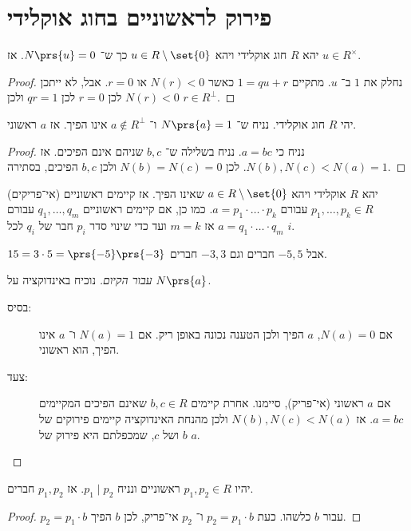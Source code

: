 \documentclass[a4paper,10pt,twoside,openany]{book}
\begin{document}
\section{פירוק לראשוניים בחוג אוקלידי}
\begin{proposition}
יהא
$R$
חוג אוקלידי ויהא
$u \in R \setminus \set{0}$
כך ש־%
$N\prs{u} = 0$.
אז
$u \in R^{\times}$.
\end{proposition}
\begin{proof}
נחלק את
$1$
ב־%
$u$.
מתקיים
$1 = qu + r$
כאשר
$N(r) < 0$
או
$r = 0$.
אבל, לא ייתכן
$N(r) < 0$
לכן
$r=0$
לכן
$qr = 1$
ולכן
$r \in R^{\perp}$.
\end{proof}
\begin{proposition}
יהי
$R$
חוג אוקלידי.
נניח ש־%
$N\prs{a} = 1$
ו־%
$a \notin R^{\perp}$
אינו הפיך.
אז
$a$
ראשוני.
\end{proposition}
\begin{proof}
נניח כי
$a=bc$.
נניח בשלילה ש־%
$b,c$
שניהם אינם הפיכים. אז
$N(b),N(c) < N(a) = 1$.
לכן
$N(b) = N(c) = 0$
ולכן
$b,c$
הפיכים, בסתירה.
\end{proof}
\begin{theorem}
יהא
$R$
אוקלידי ויהא
$a \in R \setminus \set{0}$
שאינו הפיך.
אז קיימים ראשוניים (אי־פריקים)
$p_1, \ldots, p_k \in R$
עבורם
$a = p_1 \cdot \ldots \cdot p_k$.
כמו כן, אם קיימים ראשוניים
$q_1, \ldots, q_m$
עבורם
$a = q_1\cdot\ldots\cdot q_m$
אז
$m=k$
ועד כדי שינוי סדר
$p_i$
חבר של
$q_i$
לכל
$i$.
\end{theorem}
\begin{example}
$15 = 3\cdot 5 = \prs{-5}\prs{-3}$
אבל
$-5,5$
חברים וגם
$-3,3$
חברים.
\end{example}
\begin{proof}[עבור הקיום]
נוכיח באינדוקציה על
$N\prs{a}$.
\begin{description}
\item[בסיס:]
אם
$N(a) = 0$,
$a$
הפיך ולכן הטענה נכונה באופן ריק.
אם
$N(a) = 1$
ו־%
$a$
אינו הפיך, הוא ראשוני.
\item[צעד:]
אם
$a$
ראשוני (אי־פריק), סיימנו. אחרת קיימים
$b,c \in R$
שאינם הפיכים המקיימים
$a=bc$.
אז
$N(b),N(c) < N(a)$
ולכן מהנחת האינדוקציה קיימים פירוקים של
$b$
ושל
$c$,
שמכפלתם היא פירוק של
$a$.
\end{description}
\end{proof}
\begin{proposition}
יהיו
$p_1,p_2 \in R$
ראשוניים ונניח
$p_1 \mid p_2$.
אז
$p_1,p_2$
חברים.
\end{proposition}
\begin{proof}
$p_2 = p_1 \cdot b$
עבור
$b$
כלשהו. כעת
$p_2 = p_1 \cdot b$
ו־%
$p_2$
אי־פריק, לכן
$b$
הפיך.
\end{proof}
\end{document}
